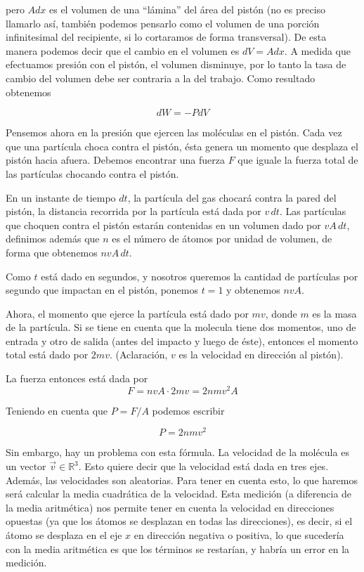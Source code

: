 \documentclass{article}
\begin{document}
pero $Adx$ es el volumen de una ``lámina'' del área del pistón (no es preciso
llamarlo así, también podemos pensarlo como el volumen de una porción
infinitesimal del recipiente, si lo cortaramos de forma transversal). De esta
manera podemos decir que el cambio en el volumen es $dV=Adx$. A medida que
efectuamos presión con el pistón, el volumen disminuye, por lo tanto la tasa de
cambio del volumen debe ser contraria a la del trabajo. Como resultado
obtenemos

\[
  dW = -PdV
\]

Pensemos ahora en la presión que ejercen las moléculas en el pistón. Cada vez
que una partícula choca contra el pistón, ésta genera un momento que desplaza
el pistón hacia afuera. Debemos encontrar una fuerza $F$ que iguale la fuerza
total de las partículas chocando contra el pistón.

En un instante de tiempo $dt$, la partícula del gas chocará contra la pared del
pistón, la distancia recorrida por la partícula está dada por $v\, dt$. Las
partículas que choquen contra el pistón estarán contenidas en un volumen dado
por $vA\,dt$, definimos además que $n$ es el número de átomos por unidad de
volumen, de forma que obtenemos $nvA\,dt$.

Como $t$ está dado en segundos, y nosotros queremos la cantidad de partículas
por segundo que impactan en el pistón, ponemos $t=1$ y obtenemos $nvA$.

Ahora, el momento que ejerce la partícula está dado por $mv$, donde $m$ es la
masa de la partícula. Si se tiene en cuenta que la molecula tiene dos momentos,
uno de entrada y otro de salida (antes del impacto y luego de éste), entonces
el momento total está dado por $2mv$. (Aclaración, $v$ es la velocidad en
dirección al pistón).

La fuerza entonces está dada por
\[
  F = nvA\cdot2mv = 2nmv^2 A
\]

Teniendo en cuenta que $P=F/A$ podemos escribir

\[
  P = 2nmv^2
\]

Sin embargo, hay un problema con esta fórmula. La velocidad de la molécula es
un vector $\vec{v}\in\mathbb R^3$. Esto quiere decir que la velocidad está dada
en tres ejes. Además, las velocidades son aleatorias. Para tener en cuenta
esto, lo que haremos será calcular la media cuadrática de la velocidad. Esta
medición (a diferencia de la media aritmética) nos permite tener en cuenta la
velocidad en direcciones opuestas (ya que los átomos se desplazan en todas las
direcciones), es decir, si el átomo se desplaza en el eje $x$ en dirección
negativa o positiva, lo que sucedería con la media aritmética es que los
términos se restarían, y habría un error en la medición.
\end{document}
